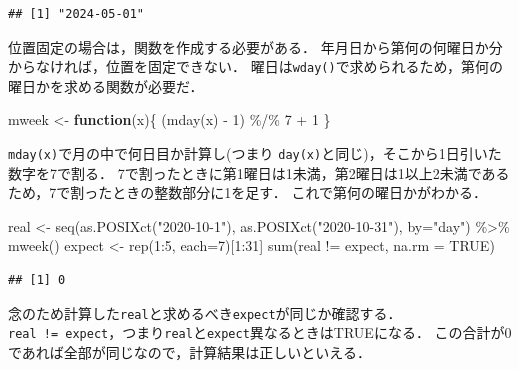 \documentclass[
]{article}
\newenvironment{Shaded}{\begin{snugshade}}{\end{snugshade}}
\newcommand{\AttributeTok}[1]{\textcolor[rgb]{0.77,0.63,0.00}{#1}}
\newcommand{\ConstantTok}[1]{\textcolor[rgb]{0.00,0.00,0.00}{#1}}
\newcommand{\ControlFlowTok}[1]{\textcolor[rgb]{0.13,0.29,0.53}{\textbf{#1}}}
\newcommand{\DecValTok}[1]{\textcolor[rgb]{0.00,0.00,0.81}{#1}}
\newcommand{\FunctionTok}[1]{\textcolor[rgb]{0.00,0.00,0.00}{#1}}
\newcommand{\NormalTok}[1]{#1}
\newcommand{\OtherTok}[1]{\textcolor[rgb]{0.56,0.35,0.01}{#1}}
\newcommand{\SpecialCharTok}[1]{\textcolor[rgb]{0.00,0.00,0.00}{#1}}
\newcommand{\StringTok}[1]{\textcolor[rgb]{0.31,0.60,0.02}{#1}}
\begin{document}
\begin{verbatim}
## [1] "2024-05-01"
\end{verbatim}

位置固定の場合は，関数を作成する必要がある．
年月日から第何の何曜日か分からなければ，位置を固定できない．
曜日は\texttt{wday()}で求められるため，第何の曜日かを求める関数が必要だ．

\begin{Shaded}
\begin{Highlighting}[]
\NormalTok{mweek }\OtherTok{\textless{}{-}} \ControlFlowTok{function}\NormalTok{(x)\{}
\NormalTok{  (}\FunctionTok{mday}\NormalTok{(x) }\SpecialCharTok{{-}} \DecValTok{1}\NormalTok{) }\SpecialCharTok{\%/\%} \DecValTok{7} \SpecialCharTok{+} \DecValTok{1}
\NormalTok{\}}
\end{Highlighting}
\end{Shaded}

\texttt{mday(x)}で月の中で何日目か計算し(つまり \texttt{day(x)}と同じ)，そこから1日引いた数字を7で割る．
7で割ったときに第1曜日は1未満，第2曜日は1以上2未満であるため，7で割ったときの整数部分に1を足す．
これで第何の曜日かがわかる．

\begin{Shaded}
\begin{Highlighting}[]
\NormalTok{real    }\OtherTok{\textless{}{-}} \FunctionTok{seq}\NormalTok{(}\FunctionTok{as.POSIXct}\NormalTok{(}\StringTok{"2020{-}10{-}1"}\NormalTok{), }\FunctionTok{as.POSIXct}\NormalTok{(}\StringTok{"2020{-}10{-}31"}\NormalTok{), }\AttributeTok{by=}\StringTok{"day"}\NormalTok{) }\SpecialCharTok{\%\textgreater{}\%} \FunctionTok{mweek}\NormalTok{()}
\NormalTok{expect }\OtherTok{\textless{}{-}} \FunctionTok{rep}\NormalTok{(}\DecValTok{1}\SpecialCharTok{:}\DecValTok{5}\NormalTok{, }\AttributeTok{each=}\DecValTok{7}\NormalTok{)[}\DecValTok{1}\SpecialCharTok{:}\DecValTok{31}\NormalTok{]}
\FunctionTok{sum}\NormalTok{(real }\SpecialCharTok{!=}\NormalTok{ expect, }\AttributeTok{na.rm =} \ConstantTok{TRUE}\NormalTok{)}
\end{Highlighting}
\end{Shaded}

\begin{verbatim}
## [1] 0
\end{verbatim}

念のため計算した\texttt{real}と求めるべき\texttt{expect}が同じか確認する．
\texttt{real\ !=\ expect}，つまり\texttt{real}と\texttt{expect}異なるときはTRUEになる．
この合計が0であれば全部が同じなので，計算結果は正しいといえる．
\end{document}
